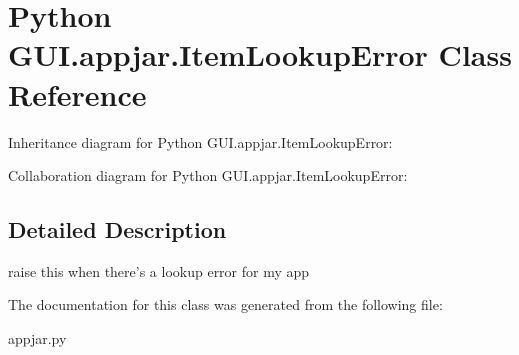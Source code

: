 \hypertarget{class_python_01_g_u_i_1_1appjar_1_1_item_lookup_error}{}\section{Python G\+U\+I.\+appjar.\+Item\+Lookup\+Error Class Reference}
\label{class_python_01_g_u_i_1_1appjar_1_1_item_lookup_error}


Inheritance diagram for Python G\+U\+I.\+appjar.\+Item\+Lookup\+Error\+:


Collaboration diagram for Python G\+U\+I.\+appjar.\+Item\+Lookup\+Error\+:


\subsection{Detailed Description}
\begin{DoxyVerb}raise this when there's a lookup error for my app\end{DoxyVerb}
 

The documentation for this class was generated from the following file\+:\begin{DoxyCompactItemize}
\item 
appjar.\+py\end{DoxyCompactItemize}
